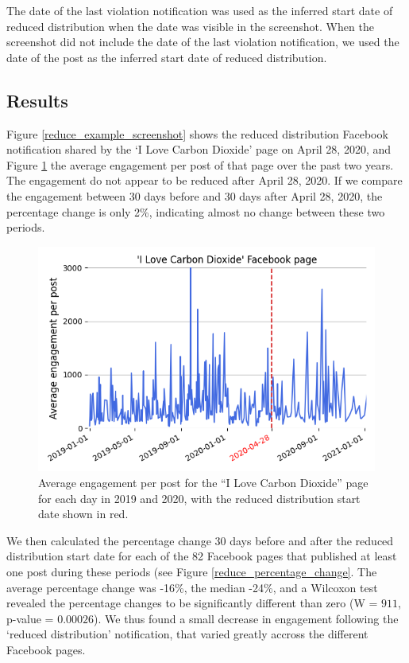 \documentclass[11pt,a4paper]{article}
\begin{document}
The date of the last violation notification was used as the inferred start date of reduced distribution when the date was visible in the screenshot. 
When the screenshot did not include the date of the last violation notification, we used the date of the post as the inferred start date of reduced distribution. 

\subsection{Results}

Figure \ref{reduce_example_screenshot} shows the reduced distribution Facebook notification shared by the ‘I Love Carbon Dioxide’ page on April 28, 2020, and Figure \ref{reduce_example_timeseries} the average engagement per post of that page over the past two years. The engagement do not appear to be reduced after April 28, 2020. 
If we compare the engagement between 30 days before and 30 days after April 28, 2020, the percentage change is only 2\%, indicating almost no change between these two periods.

\begin{figure}[!h]
\centering
\includegraphics[width=\linewidth]{./../figure/reduce_example_timeseries.png}
\caption{Average engagement per post for the “I Love Carbon Dioxide” page for each day in 2019 and 2020, with the reduced distribution start date shown in red.}
\label{reduce_example_timeseries}
\end{figure}

We then calculated the percentage change 30 days before and after the reduced distribution start date for each of the 82 Facebook pages that published at least one post during these periods (see Figure \ref{reduce_percentage_change}. 
The average percentage change was -16\%, the median -24\%, and a Wilcoxon test revealed the percentage changes to be significantly different than zero (W = $911$, p-value = $0.00026$).
We thus found a small decrease in engagement following the `reduced distribution' notification, that varied greatly accross the different Facebook pages.
\end{document}
